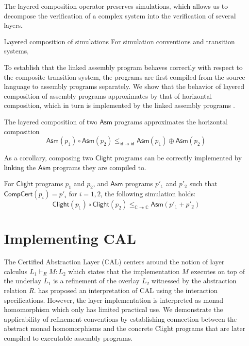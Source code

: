 \documentclass[sigplan,10pt,review,anonymous]{acmart}
\newcommand{\kw}[1]{\ensuremath{ \mathsf{#1} }}
\begin{document}
The layered composition operator preserves simulations, which allows us to
decompose the verification of a complex system into the verification of several
layers.

\begin{theorem}{Layered composition of simulations}
For simulation conventions and transition systems,  
\end{theorem}

To establish that the linked assembly program behaves correctly with respect to
the composite transition system, the programs are first compiled from the source
language to assembly programs separately. We show that the behavior of layered
composition of assembly programs approximates by that of horizontal
composition, which in turn is implemented by the linked assembly programs
\cite{compcerto21tr}.

\begin{theorem}
  The layered composition of two \kw{Asm} programs approximates the horizontal
  composition
  \[
    \kw{Asm}(p_1) \circ \kw{Asm}(p_2) \le_{\kw{id} \twoheadrightarrow \kw{id}}
    \kw{Asm}(p_1) \oplus \kw{Asm}(p_2)
  \]
\end{theorem}

As a corollary, composing two $\kw{Clight}$ programs can be correctly
implemented by linking the $\kw{Asm}$ programs they are compiled to.
\begin{corollary}
  For $\kw{Clight}$ programs $p_1$ and $p_2$, and $\kw{Asm}$ programs
  $p'_1$ and $p'_2$ such that $\kw{CompCert}(p_i) = p'_i$ for $i=1,2$,
  the following simulation holds:
  \[
    \kw{Clight}(p_1)\circ\kw{Clight}(p_2) \le_{\mathbb{C} \twoheadrightarrow \mathbb{C}}
    \kw{Asm}(p'_1 + p'_2)
  \]
\end{corollary}






\section{Implementing CAL} \label{sec:cal}

The Certified Abstraction Layer (CAL) centers around the notion of layer
calculus $L_1 \vdash_R M : L_2$ which states that the implementation $M$
executes on top of the underlay $L_1$ is a refinement of the overlay $L_2$
witnessed by the abstraction relation $R$. \citet{rbgs-cal} has proposed an
interpretation of CAL using the interaction specifications. However, the layer
implementation is interpreted as monad homomorphism which only has limited
practical use. We demonstrate the applicability of refinement conventions by
establishing connection between the abstract monad homomorphisms and the
concrete Clight programs that are later compiled to executable assembly
programs.
\end{document}
